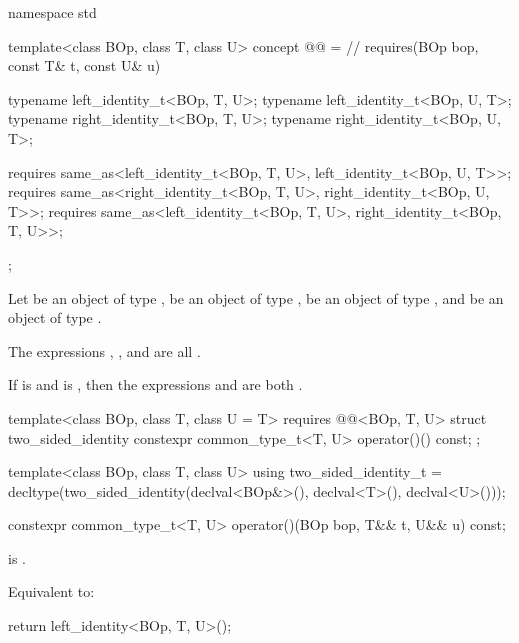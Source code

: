 \begin{itemdecl}
namespace std {
  template<class BOp, class T, class U>
  concept @@ = // \expos
    requires(BOp bop, const T& t, const U& u) {
       typename left_identity_t<BOp, T, U>;
       typename left_identity_t<BOp, U, T>;
       typename right_identity_t<BOp, T, U>;
       typename right_identity_t<BOp, U, T>;

       requires same_as<left_identity_t<BOp, T, U>, left_identity_t<BOp, U, T>>;
       requires same_as<right_identity_t<BOp, T, U>, right_identity_t<BOp, U, T>>;
       requires same_as<left_identity_t<BOp, T, U>, right_identity_t<BOp, T, U>>;

    };
}
\end{itemdecl}
\begin{itemdescr}
   \pnum
   Let  be an object of type ,  be an object
   of type ,  be an object of type
   , and  be an object of type
   .

   \pnum
   The expressions , , and
    are all .

   \pnum
   If  is  and  is , then the
   expressions  and  are both
   .
\end{itemdescr}

\begin{itemdecl}
  template<class BOp, class T, class U = T>
  requires @@<BOp, T, U>
  struct two_sided_identity {
     constexpr common_type_t<T, U> operator()() const;
  };

  template<class BOp, class T, class U>
  using two_sided_identity_t =
    decltype(two_sided_identity{}(declval<BOp&>(), declval<T>(), declval<U>()));
\end{itemdecl}

\begin{itemdecl}
constexpr common_type_t<T, U> operator()(BOp bop, T&& t, U&& u) const;
\end{itemdecl}
\begin{itemdescr}
   \pnum
   \expects {} is .

   \pnum
   \effects Equivalent to:
   \begin{codeblock}
      return left_identity<BOp, T, U>{}();
   \end{codeblock}
\end{itemdescr}

